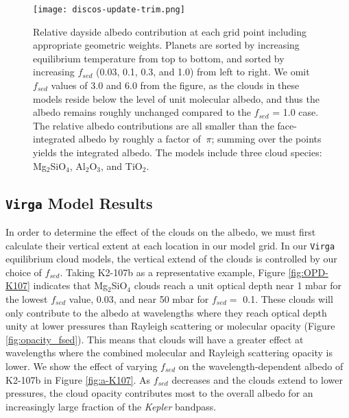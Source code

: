 \documentclass[twocolumn]{aastex63}
\begin{document}
\begin{figure*}
\centering
\texttt{[image: discos-update-trim.png]}
\caption{Relative dayside albedo contribution at each grid point including appropriate geometric weights.  Planets are sorted by increasing equilibrium temperature from top to bottom, and sorted by increasing $f_{sed}$ (0.03, 0.1, 0.3, and 1.0) from left to right. We omit $f_{sed}$ values of 3.0 and 6.0 from the figure, as the clouds in these models reside below the level of unit molecular albedo, and thus the albedo remains roughly unchanged compared to the $f_{sed}$ = 1.0 case. The relative albedo contributions are all smaller than the face-integrated albedo by roughly a factor of $~\pi$; summing over the points yields the integrated albedo. The models include three cloud species: Mg$_2$SiO$_4$, Al$_2$O$_3$, and TiO$_2$.}
\label{fig:discos}
\end{figure*}

\subsection{\texttt{Virga} Model Results}

In order to determine the effect of the clouds on the albedo, we must first calculate their vertical extent at each location in our model grid.  In our \texttt{Virga} equilibrium cloud models, the vertical extend of the clouds is controlled by our choice of $f_{sed}$.   Taking K2-107b as a representative example, Figure \ref{fig:OPD-K107} indicates that Mg$_2$SiO$_4$ clouds reach a unit optical depth near 1 mbar for the lowest $f_{sed}$ value, 0.03, and near 50 mbar for $f_{sed}=$ 0.1.  These clouds will only contribute to the albedo at wavelengths where they reach optical depth unity at lower pressures than Rayleigh scattering or molecular opacity (Figure \ref{fig:opacity_fsed}).  This means that clouds will have a greater effect at wavelengths where the combined molecular and Rayleigh scattering opacity is lower.  We show the effect of varying $f_{sed}$ on the wavelength-dependent albedo of K2-107b in Figure \ref{fig:a-K107}.  As $f_{sed}$ decreases and the clouds extend to lower pressures, the cloud opacity contributes most to the overall albedo for an increasingly large fraction of the \emph{Kepler} bandpass.
\end{document}
